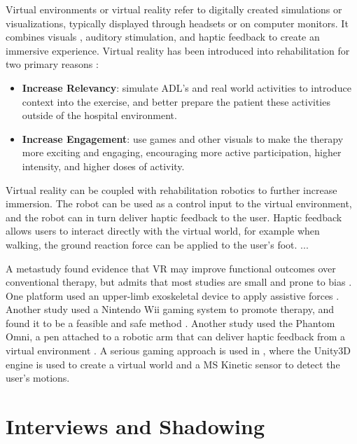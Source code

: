 \documentclass[12pt]{report}
\begin{document}
	Virtual environments or virtual reality refer to digitally created simulations or visualizations, typically displayed through headsets or on computer monitors. It combines visuals , auditory stimulation, and haptic feedback to create an immersive experience. Virtual reality has been introduced into rehabilitation for two primary reasons \cite{Laver2015}:
	\begin{itemize}
		\item \textbf{Increase Relevancy}: simulate ADL's and real world activities to introduce context into the exercise, and better prepare the patient these activities outside of the hospital environment.
		\item \textbf{Increase Engagement}: use games and other visuals to make the therapy more exciting and engaging, encouraging more active participation, higher intensity, and higher doses of activity. 
	\end{itemize}

	Virtual reality can be coupled with rehabilitation robotics to further increase immersion. The robot can be used as a control input to the virtual environment, and the robot can in turn deliver haptic feedback to the user. Haptic feedback allows users to interact directly with the virtual world, for example when walking, the ground reaction force can be applied to the user's foot. ...
	
	A metastudy found evidence that VR may improve functional outcomes over conventional therapy, but admits that most studies are small and prone to bias \cite{Laver2015}. One platform used an upper-limb exoskeletal device to apply assistive forces  \cite{Patel2015}. Another study used a Nintendo Wii gaming system to promote therapy, and found it to be a feasible and safe method  \cite{Saposnik2010}. Another study used the Phantom Omni, a pen attached to a robotic arm that can deliver haptic feedback from a virtual environment \cite{Jiang2017}. A serious gaming approach is used in \cite{SociedadeBrasileiradeInformaticaemSaude2014}, where the Unity3D engine is used to create a virtual world and a MS Kinetic sensor to detect the user's motions. 
	
	
\section{Interviews and Shadowing}

%
	
\end{document}
